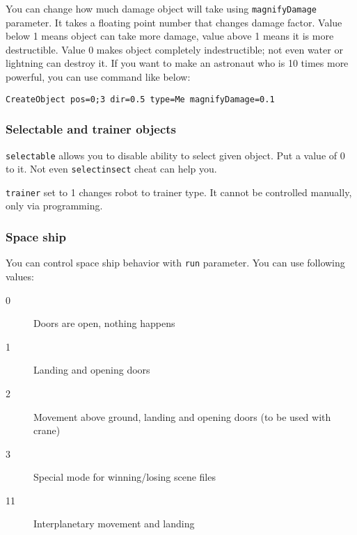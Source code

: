 You can change how much damage object will take using \texttt{magnifyDamage} parameter. It takes a floating point number that changes damage factor. Value below 1 means object can take more damage, value above 1 means it is more destructible. Value 0 makes object completely indestructible; not even water or lightning can destroy it. If you want to make an astronaut who is 10 times more powerful, you can use command like below:

\begin{verbatim}
CreateObject pos=0;3 dir=0.5 type=Me magnifyDamage=0.1
\end{verbatim}


\subsubsection{Selectable and trainer objects}

\texttt{selectable} allows you to disable ability to select given object. Put a value of 0 to it. Not even \texttt{selectinsect} cheat can help you.

\texttt{trainer} set to 1 changes robot to trainer type. It cannot be controlled manually, only via programming.



\subsubsection{Space ship}

You can control space ship behavior with \texttt{run} parameter. You can use following values:

\begin{description}
    \item[0] Doors are open, nothing happens
    \item[1] Landing and opening doors
    \item[2] Movement above ground, landing and opening doors (to be used with crane)
    \item[3] Special mode for winning/losing scene files
    \item[11] Interplanetary movement and landing
\end{description}


